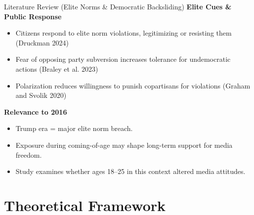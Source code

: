 \documentclass[
  ignorenonframetext,
]{beamer}
\providecommand{\tightlist}{%
  \setlength{\itemsep}{0pt}\setlength{\parskip}{0pt}}
\begin{document}
\begin{frame}{Literature Review (Elite Norms \& Democratic Backsliding)}
\label{literature-review-elite-norms-democratic-backsliding}
\textbf{Elite Cues \& Public Response}

\begin{itemize}
\tightlist
\item
  Citizens respond to elite norm violations, legitimizing or resisting
  them (Druckman 2024)
\item
  Fear of opposing party subversion increases tolerance for undemocratic
  actions (Braley et al. 2023)
\item
  Polarization reduces willingness to punish copartisans for violations
  (Graham and Svolik 2020)
\end{itemize}

\textbf{Relevance to 2016}

\begin{itemize}
\tightlist
\item
  Trump era = major elite norm breach.
\item
  Exposure during coming-of-age may shape long-term support for media
  freedom.
\item
  Study examines whether ages 18--25 in this context altered media
  attitudes.
\end{itemize}
\end{frame}

\section{Theoretical Framework}\label{theoretical-framework}
\end{document}
